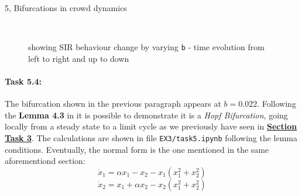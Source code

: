 \documentclass[10pt,a4paper]{article}
\begin{document}
\begin{task}{5, Bifurcations in crowd dynamics}
\begin{figure}[ht!]
 \\
 \caption{showing SIR behaviour change by varying \texttt{b} - time evolution from left to right and up to down}%
 \label{fig:sir-bifurcation}%
\end{figure}
\pagebreak



\paragraph{Task 5.4:}
The bifurcation shown in the previous paragraph appears at $b = 0.022$. Following the \textbf{Lemma 4.3} in \cite{kuznetsov} it is possible to demonstrate it is a \textit{Hopf Bifurcation}, going locally from a steady state to a limit cycle as we previously have seen in \textbf{\hyperref[sec:task3]{Section Task 3}}. The calculations are shown in file \texttt{EX3/task5.ipynb} following the lemma conditions. Eventually, the normal form is the one mentioned in the same aforementiond section:
$$\dot x_1 = \alpha x_1 - x_2 - x_1(x_1^2 + x_2^2)$$
$$\dot x_2 = x_1 + \alpha x_2 - x_2(x_1^2 + x_2^2)$$


\end{task}
\end{document}

